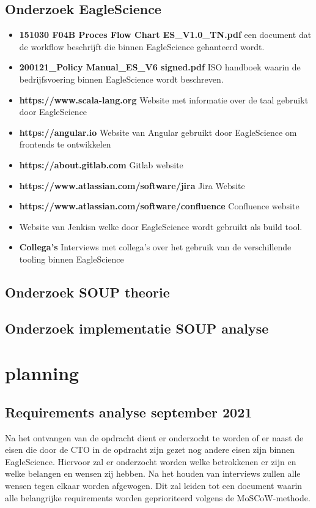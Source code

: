 \subsection{Onderzoek EagleScience}
\begin{itemize}
    \item \textbf{151030 F04B Proces Flow Chart ES\_V1.0\_TN.pdf} een document dat de workflow beschrijft die binnen EagleScience gehanteerd wordt.
    \item \textbf{200121\_Policy Manual\_ES\_V6 signed.pdf} ISO handboek waarin de bedrijfsvoering binnen EagleScience wordt beschreven.
    \item \textbf{https://www.scala-lang.org} Website met informatie over de taal gebruikt door EagleScience
    \item \textbf{https://angular.io} Website van Angular gebruikt door EagleScience om frontends te ontwikkelen
    \item \textbf{https://about.gitlab.com} Gitlab website
    \item \textbf{https://www.atlassian.com/software/jira} Jira Website
    \item \textbf{https://www.atlassian.com/software/confluence} Confluence website
    \item {} Website van Jenkisn welke door EagleScience wordt gebruikt als build tool.
    \item \textbf{Collega's} Interviews met collega's over het gebruik van de verschillende tooling binnen EagleScience
\end{itemize}

\subsection{Onderzoek SOUP theorie}

\subsection{Onderzoek implementatie SOUP analyse}


\section{planning}\label{subsec:planning}

\subsection{Requirements analyse \textbf{september 2021}}\label{sec:requirements-analyse}
Na het ontvangen van de opdracht dient er onderzocht te worden of er naast de eisen die door de CTO in de opdracht zijn gezet nog andere eisen zijn binnen EagleScience. Hiervoor zal er onderzocht worden welke betrokkenen er zijn en welke belangen en wensen zij hebben. Na het houden van interviews zullen alle wensen tegen elkaar worden afgewogen. Dit zal leiden tot een document waarin alle belangrijke requirements worden geprioriteerd volgens de MoSCoW-methode.

